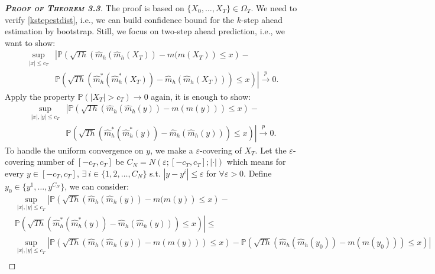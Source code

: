 \documentclass[a4paper]{article}
\begin{document}
\begin{proof}[\textbf{\textsc{Proof of Theorem 3.3}}]
The proof is based on $\{X_0,\ldots,X_T\}\in \Omega_T$. We need to verify \cref{kstepestdist}, i.e., we can build confidence bound for the $k$-step ahead estimation by bootstrap. Still, we focus on two-step ahead prediction, i.e., we want to show:
\begin{equation}\label{2stepestdist}
\begin{split}
    \sup_{|x|\leq c_{T}} & \left| \mathbb{P}\left( \sqrt{Th}\left(\widehat{m}_{h}(\widehat{m}_{h}(X_T)) -  m(m(X_T) \right)\leq x  \right) -  \right. \\
    &\left. \mathbb{P}\left( \sqrt{Th}\left( \widehat{m}^*_{h}(\widehat{m}^*_{h}(X_T))- \widehat{m}_{h}(\widehat{m}_{h}(X_T))   \right)\leq x  \right)
     \right| \overset{p}{\to} 0.
\end{split}
\end{equation}
Apply the property $\mathbb{P}(|X_T|> c_T)\to 0$ again, it is enough to show:
\begin{equation}\label{2stepestdistsim}
\begin{split}
    \sup_{|x|, |y| \leq c_{T}} & \left| \mathbb{P}\left( \sqrt{Th}\left(\widehat{m}_{h}(\widehat{m}_{h}(y)) -  m(m(y))   \right)\leq x  \right) -  \right. \\
    &\left. \mathbb{P}\left( \sqrt{Th}\left( \widehat{m}^*_{h}(\widehat{m}^*_{h}(y))- \widehat{m}_{h}(\widehat{m}_{h}(y))   \right)\leq x  \right)
     \right| \overset{p}{\to} 0.
\end{split}
\end{equation}
 To handle the uniform convergence on $y$, we make a $\varepsilon$-covering of $X_T$. Let the $\varepsilon$-covering number of $[-c_T,c_T]$ be $C_{N} = N(\varepsilon;[-c_T,c_T];|\cdot|)$ which means for every $y\in[-c_T,c_T]$, $\exists~i\in\{1,2,\ldots, C_{N}\}$ s.t. $|y - y^{i}|\leq \varepsilon$ for $\forall \varepsilon>0$. Define $y_0 \in \{y^{1},\ldots,y^{C_{N}}\}$, we can consider:
\begin{equation}\label{2stepestdistsp}
\begin{split}
    &\sup_{|x|, |y| \leq c_{T}}  \left| \mathbb{P}\left( \sqrt{Th}\left(\widehat{m}_{h}(\widehat{m}_{h}(y)) -  m(m(y)  \right)\leq x  \right) - \right. \\
    &\left. \mathbb{P}\left( \sqrt{Th}\left( \widehat{m}^*_{h}(\widehat{m}^*_{h}(y))- \widehat{m}_{h}(\widehat{m}_{h}(y))   \right)\leq x  \right)
     \right| \leq \\
    &\sup_{|x|, |y| \leq c_{T}}  \left|\mathbb{P}\left( \sqrt{Th}\left(\widehat{m}_{h}(\widehat{m}_{h}(y)) -  m(m(y))   \right)\leq x  \right)  - \mathbb{P}\left( \sqrt{Th}\left(\widehat{m}_{h}(\widehat{m}_{h}(y_0)) -  m(m(y_0))   \right)\leq x  \right) \right|\\

\end{split}
\end{equation}
\end{proof}
\end{document}
